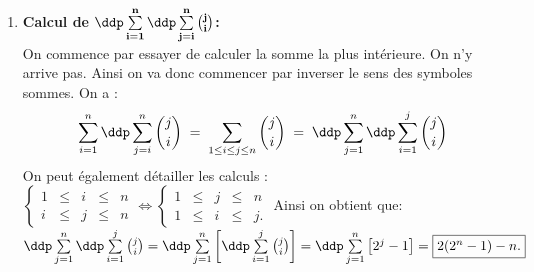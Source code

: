 \begin{correction}
\begin{enumerate}
\begin{itemize}
\end{itemize}
\item  \textbf{Calcul de $\mathbf{\ddp \sum\limits_{i=1}^n\ddp \sum\limits_{j=i}^n \binom{j}{i}}$:}\\
\noindent On commence par essayer de calculer la somme la plus int\'erieure. On n'y arrive pas. Ainsi on va donc commencer par inverser le sens des symboles sommes. On a :
$$\sum\limits_{i=1}^n\ddp \sum\limits_{j=i}^n \binom{j}{i} \;=\; \sum\limits_{1\leq i \leq j \leq n} \binom{j}{i} \;=\;\ddp \sum\limits_{j=1}^n\ddp \sum\limits_{i=1}^j \binom{j}{i}$$
On peut \'egalement d\'etailler les calculs :
$\left\lbrace \begin{array}{lllll}
1 & \leq & i & \leq & n\\
i & \leq & j & \leq & n
\end{array}\right.
\Longleftrightarrow
\left\lbrace \begin{array}{lllll}
1 & \leq &j & \leq & n\\
1 & \leq & i & \leq & j.
\end{array}\right.
$
Ainsi on obtient que: 
$\ddp \sum\limits_{j=1}^n\ddp \sum\limits_{i=1}^j \binom{j}{i}=
\ddp \sum\limits_{j=1}^n \left\lbrack  \ddp \sum\limits_{i=1}^j \binom{j}{i}  \right\rbrack=
\ddp \sum\limits_{j=1}^n \left\lbrack 2^j-1 \right\rbrack=\fbox{$2(2^n-1)-n.$}
$
\end{enumerate}
\end{correction}